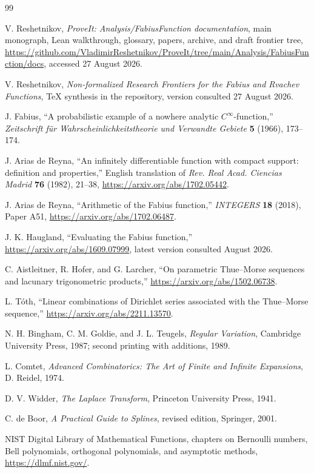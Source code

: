 \documentclass[11pt,oneside]{article}
\theoremstyle{definition}
\theoremstyle{remark}
\newcommand{\1}{\mathbf 1}
\begin{document}
\begin{thebibliography}{99}

V. Reshetnikov,
\emph{ProveIt: Analysis/FabiusFunction documentation},
main monograph, Lean walkthrough, glossary, papers, archive, and draft frontier tree,
\url{https://github.com/VladimirReshetnikov/ProveIt/tree/main/Analysis/FabiusFunction/docs},
accessed 27 August 2026.

V. Reshetnikov,
\emph{Non-formalized Research Frontiers for the Fabius and Rvachev Functions},
TeX synthesis in the \repoPartii{} repository, version consulted 27 August 2026.

J. Fabius,
``A probabilistic example of a nowhere analytic $C^\infty$-function,''
\emph{Zeitschrift f\"ur Wahrscheinlichkeitstheorie und Verwandte Gebiete}
\textbf{5} (1966), 173--174.

J. Arias de Reyna,
``An infinitely differentiable function with compact support: definition and properties,''
English translation of \emph{Rev. Real Acad. Ciencias Madrid} \textbf{76} (1982), 21--38,
\url{https://arxiv.org/abs/1702.05442}.

J. Arias de Reyna,
``Arithmetic of the Fabius function,''
\emph{INTEGERS} \textbf{18} (2018), Paper A51,
\url{https://arxiv.org/abs/1702.06487}.

J. K. Haugland,
``Evaluating the Fabius function,''
\url{https://arxiv.org/abs/1609.07999}, latest version consulted August 2026.

C. Aistleitner, R. Hofer, and G. Larcher,
``On parametric Thue--Morse sequences and lacunary trigonometric products,''
\url{https://arxiv.org/abs/1502.06738}.

L. T\'oth,
``Linear combinations of Dirichlet series associated with the Thue--Morse sequence,''
\url{https://arxiv.org/abs/2211.13570}.

N. H. Bingham, C. M. Goldie, and J. L. Teugels,
\emph{Regular Variation},
Cambridge University Press, 1987; second printing with additions, 1989.

L. Comtet,
\emph{Advanced Combinatorics: The Art of Finite and Infinite Expansions},
D. Reidel, 1974.

D. V. Widder,
\emph{The Laplace Transform},
Princeton University Press, 1941.

C. de Boor,
\emph{A Practical Guide to Splines}, revised edition,
Springer, 2001.

NIST Digital Library of Mathematical Functions,
chapters on Bernoulli numbers, Bell polynomials, orthogonal polynomials, and asymptotic methods,
\url{https://dlmf.nist.gov/}.

\end{thebibliography}
\end{document}
